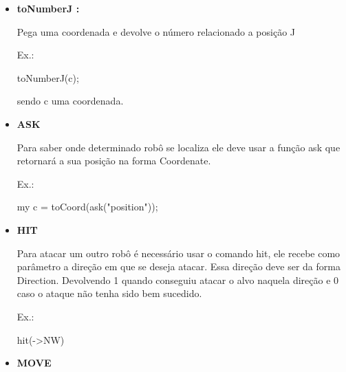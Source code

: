 \documentclass[a4paper]{article}
\begin{document}
{{{{{{{{{\begin{itemize}
            Pega uma coordenada e devolve o número relacionado
            a posição I
            
            \textcolor{NavyBlue}{Ex.:}
            
            toNumberI(c);
            
            sendo c uma coordenada.
            
        \bigskip
        
        \item \textbf{toNumberJ :}
            
            Pega uma coordenada e devolve o número relacionado
            a posição J
            
            \textcolor{NavyBlue}{Ex.:}
            
            toNumberJ(c);
            
            sendo c uma coordenada.
            
       
       
\newpage %
        
         
        \item \textbf{ASK}
        
            Para saber onde determinado robô se localiza
            ele deve usar a função 
            \textcolor{NavyBlue}{ask} 
            que retornará a sua posição na forma
            Coordenate.
        
            \textcolor{NavyBlue}{Ex.:}
        
            my c = toCoord(ask("position"));
        
        \bigskip
        
        \item \textbf{HIT}
            
            Para atacar um outro robô é necessário 
            usar o comando
            \textcolor{NavyBlue}{hit},
            ele recebe como parâmetro a direção em
            que se deseja atacar. 
            Essa direção deve ser da forma Direction.
            Devolvendo 1 quando conseguiu atacar o
            alvo naquela direção e 0 caso o ataque
            não tenha sido bem sucedido.
            
            \textcolor{NavyBlue}{Ex.:}
            
            hit(->NW)

        \bigskip
        
        \item \textbf{MOVE}
            

\end{itemize}}}}}}}}}}
\end{document}
